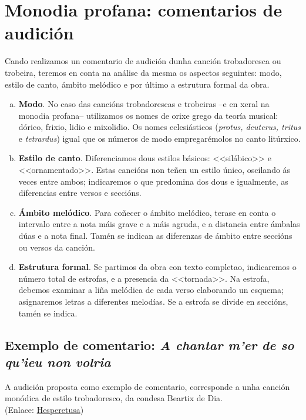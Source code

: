 %
%
\section{Monodia profana: comentarios de audición} \label{sec:modelo-trovadorescas}
%
Cando realizamos un comentario de audición dunha canción trobadoresca ou trobeira, teremos en conta na análise da mesma os aspectos seguintes: modo, estilo de canto, ámbito melódico e por último a estrutura formal da obra.

\begin{multicols}{2}
    \begin{enumerate}[a)]
\item \textbf{Modo}.
No caso das cancións trobadorescas e trobeiras --e en xeral na monodia profana-- utilizamos os nomes de orixe grego da teoría musical: dórico, frixio, lidio e mixolidio. Os nomes eclesiásticos (\textit{protus, deuterus, tritus} e \textit{tetrardus}) igual que os números de modo empregarémolos no canto litúrxico.

\item \textbf{Estilo de canto}.
Diferenciamos dous estilos básicos: <<silábico>> e <<ornamentado>>. Estas cancións non teñen un estilo único, oscilando ás veces entre ambos; indicaremos o que predomina dos dous e igualmente, as diferencias entre versos e seccións.

\item \textbf{Ámbito melódico}.
Para coñecer o ámbito melódico, terase en conta o intervalo entre a nota máis grave e a máis agruda, e a distancia entre ámbalas dúas e a nota final. Tamén se indican as diferenzas de ámbito entre seccións ou versos da canción.

\item \textbf{Estrutura formal}.
Se partimos da obra con texto completao, indicaremos o número total de estrofas, e a presencia da <<tornada>>.
Na estrofa, debemos examinar a liña melódica de cada verso elaborando un esquema; asignaremos letras a diferentes melodías. Se a estrofa se divide en seccións, tamén se indica.
    \end{enumerate}
\end{multicols}
%
\subsection*{Exemplo de comentario: \textit{A chantar m’er de so qu’ieu non volria}} 
A audición proposta como exemplo de comentario, corresponde a unha canción monódica de estilo trobadoresco, da condesa Beartix de Dia. 
\\ 
(Enlace: \href{https://hesperetusa.wordpress.com/2011/04/22/a-chantar-mer-de-so-quieu-non-volria/}{Hesperetusa})

